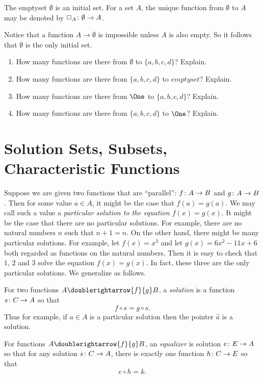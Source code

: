 \begin{principle}
	The emptyset $\emptyset$ is an initial set. For a set $A$, the unique
	function from $\emptyset$ to $A$ may be denoted by 
	${\Box_A}\colon{\emptyset}\to{A}$.
\end{principle}

Notice that a function $A\to\emptyset$ is impossible unless $A$ is also empty.
So it follows that $\emptyset$ is the only initial set. 

\begin{exercises}
	\begin{enumerate}
		\item How many functions are there from $\emptyset$ to $\{a,b,c,d\}$? Explain.
		\item How many functions are there from $\{a,b,c,d\}$ to $emptyset$? Explain.
		\item How many functions are there from $\One$ to $\{a,b,c,d\}$? Explain.
		\item How many functions are there from $\{a,b,c,d\}$ to $\One$? Explain.
	\end{enumerate}
\end{exercises}

\section{Solution Sets, Subsets, Characteristic Functions}

Suppose we are given two functions that are ``parallel'': ${f}\colon{A}\to{B}$ and ${g}\colon{A}\to{B}$.
Then for some value $a\in A$, it might be the case that $f(a)=g(a)$.
We may call such a value a \emph{particular solution to the equation $f(x)=g(x)$}. 
It might be the case that there are no particular solutions.
For example, there are no natural numbers $n$ such that $n+1 = n$. 
On the other hand, there might be many particular solutions. 
For example, let $f(x)=x^3$ and let $g(x)= 6x^2 - 11x + 6$ both regarded as functions on the natural numbers.
Then it is easy to check that $1$, $2$ and $3$ solve the equation $f(x)=g(x)$.
In fact, these three are the only particular solutions.
We generalize as follows.

\begin{defn}\label{def:equalizer} 
	For two functions $A\doublerightarrow{f}{g} B$, a \emph{solution} is a function ${s}\colon{C}\to{A}$ so that 
	\[f\circ s = g\circ s.\]
	Thus for example, if $a\in A$ is a particular solution then the pointer $\hat a$ is a solution. 

	For functions $A\doublerightarrow{f}{g} B$, an \emph{equalizer} is solution ${e}\colon{E}\to{A}$ so that for any solution ${s}\colon{C}\to{A}$, there is exactly one function ${h}\colon{C}\to{E}$ so that \[e\circ h = k.\]
\end{defn}

